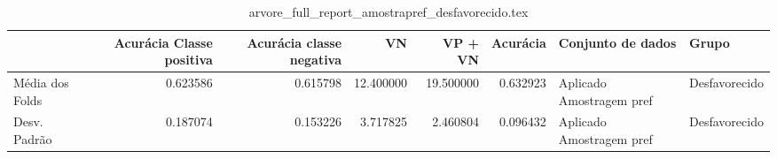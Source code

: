 \begin{table}
\centering
\caption{arvore_full_report_amostrapref_desfavorecido.tex}
\label{arvore_full_report_amostrapref_desfavorecido.tex}
\begin{tabular}{lrrrrrll}
\toprule
{} &  Acurácia Classe positiva &  Acurácia classe negativa &        VN  &   VP + VN  &  Acurácia &         Conjunto de dados &          Grupo \\
\midrule
Média dos Folds &                  0.623586 &                  0.615798 &  12.400000 &  19.500000 &  0.632923 &  Aplicado Amostragem pref &  Desfavorecido \\
Desv. Padrão    &                  0.187074 &                  0.153226 &   3.717825 &   2.460804 &  0.096432 &  Aplicado Amostragem pref &  Desfavorecido \\
\bottomrule
\end{tabular}
\end{table}
